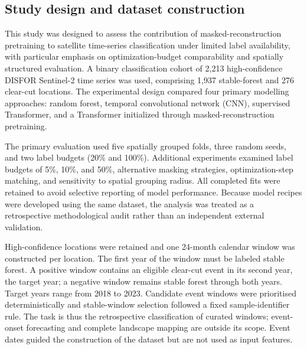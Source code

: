 \documentclass[11pt,a4paper]{article}
\begin{document}
\subsection{Study design and dataset construction}
This study was designed to assess the contribution of masked-reconstruction pretraining to satellite time-series classification under limited label availability, with particular emphasis on optimization-budget comparability and spatially structured evaluation. A binary classification cohort of 2,213 high-confidence DISFOR Sentinel-2 time series was used, comprising 1,937 stable-forest and 276 clear-cut locations. The experimental design compared four primary modelling approaches: random forest, temporal convolutional network (CNN), supervised Transformer, and a Transformer initialized through masked-reconstruction pretraining.

The primary evaluation used five spatially grouped folds, three random seeds, and two label budgets (20\% and 100\%). Additional experiments examined label budgets of 5\%, 10\%, and 50\%, alternative masking strategies, optimization-step matching, and sensitivity to spatial grouping radius. All completed fits were retained to avoid selective reporting of model performance. Because model recipes were developed using the same dataset, the analysis was treated as a retrospective methodological audit rather than an independent external validation.

High-confidence locations were retained and one 24-month calendar window was constructed per location. The first year of the window must be labeled stable forest. A positive window contains an eligible clear-cut event in its second year, the target year; a negative window remains stable forest through both years. Target years range from 2018 to 2023. Candidate event windows were prioritised deterministically and stable-window selection followed a fixed sample-identifier rule. The task is thus the retrospective classification of curated windows; event-onset forecasting and complete landscape mapping are outside its scope. Event dates guided the construction of the dataset but are not used as input features.
\end{document}
